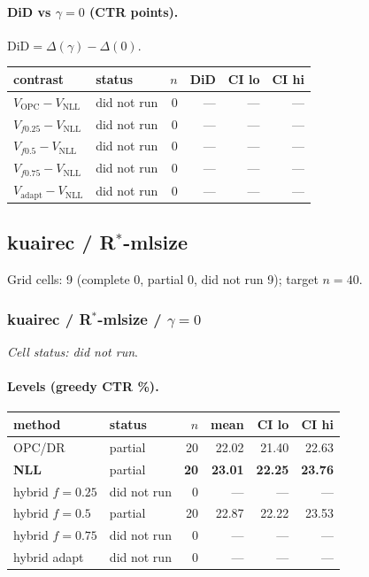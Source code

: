 \documentclass[10pt,a4paper]{article}
\begin{document}
\paragraph{DiD vs $\gamma=0$ (CTR points).} $\mathrm{DiD}=\Delta(\gamma)-\Delta(0)$.
{\centering\small\begin{tabular}{llrrrr}
\toprule contrast & status & $n$ & DiD & CI lo & CI hi \\
\midrule
$V_{\mathrm{OPC}}-V_{\mathrm{NLL}}$ & did not run & 0 & --- & --- & --- \\
$V_{f0.25}-V_{\mathrm{NLL}}$ & did not run & 0 & --- & --- & --- \\
$V_{f0.5}-V_{\mathrm{NLL}}$ & did not run & 0 & --- & --- & --- \\
$V_{f0.75}-V_{\mathrm{NLL}}$ & did not run & 0 & --- & --- & --- \\
$V_{\mathrm{adapt}}-V_{\mathrm{NLL}}$ & did not run & 0 & --- & --- & --- \\
\bottomrule\end{tabular}\par}
\bigskip
\newpage
\subsection{kuairec / R$^*$-mlsize}
Grid cells: 9 (complete 0, partial 0, did not run 9); target $n=40$.
\subsubsection{kuairec / R$^*$-mlsize / $\gamma=0$}
\emph{Cell status: did not run}.
\paragraph{Levels (greedy CTR \%).}
{\centering\small\begin{tabular}{llrrrr}
\toprule method & status & $n$ & mean & CI lo & CI hi \\
\midrule
OPC/DR & partial & 20 & 22.02 & 21.40 & 22.63 \\
\textbf{NLL} & partial & \textbf{20} & \textbf{23.01} & \textbf{22.25} & \textbf{23.76} \\
hybrid $f{=}0.25$ & did not run & 0 & --- & --- & --- \\
hybrid $f{=}0.5$ & partial & 20 & 22.87 & 22.22 & 23.53 \\
hybrid $f{=}0.75$ & did not run & 0 & --- & --- & --- \\
hybrid adapt & did not run & 0 & --- & --- & --- \\
\bottomrule\end{tabular}\par}
\end{document}
